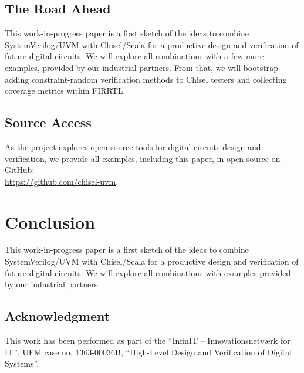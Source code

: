 \documentclass[conference]{IEEEtran}
\newcommand{\todo}[1]{{\color{olive} TODO: #1}}
\newcommand{\martin}[1]{{\color{blue} Martin: #1}}
\newcommand{\ducky}[1]{{\color{orange} Richard: #1}}
\renewcommand{\todo}[1]{}
\renewcommand{\martin}[1]{}
\renewcommand{\ducky}[1]{}
\begin{document}





\subsection{The Road Ahead}

\todo{ScalaTest and PBT with ScalaCheck.}

This work-in-progress paper is a first sketch of the ideas to combine SystemVerilog/UVM
with Chisel/Scala for a productive design and verification of future digital circuits.
We will explore all combinations with a few more examples, provided by our industrial
partners.
From that, we will bootstrap adding constraint-random verification methods to Chisel
testers and collecting coverage metrics within FIRRTL.

\subsection{Source Access}

As the project explores open-source tools for digital circuits design
and verification, we provide all examples, including this paper, in open-source
on GitHub:\\ \url{https://github.com/chisel-uvm}.


\section{Conclusion}
\label{sec:conclusion}

This work-in-progress paper is a first sketch of the ideas to combine SystemVerilog/UVM
with Chisel/Scala for a productive design and verification of future digital circuits.
We will explore all combinations with examples provided by our industrial partners.



\subsection*{Acknowledgment}

This work has been performed as part of the
``InfinIT -- Innovationsnetv{\ae}rk for IT'', UFM case no. 1363-00036B,
``High-Level Design and Verification of Digital Systems''.







\end{document}
